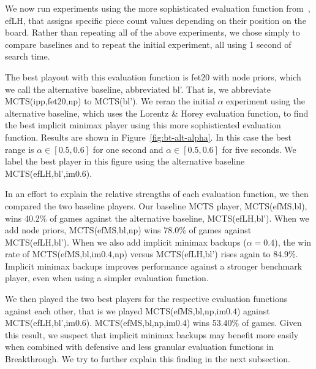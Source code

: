 \documentclass{article}
\begin{document}

\vspace{0.1cm}

We now run experiments using the more sophisticated evaluation function from~\cite{Lorentz13Breakthrough}, 
efLH, that assigns specific piece count values depending on their position on the board. 
Rather than repeating all of the above experiments, we chose simply to compare baselines and to repeat
the initial experiment, all using 1 second of search time.

The best playout with this evaluation function is fet$20$ with node priors, which we call the alternative baseline, 
abbreviated bl'.
That is, we abbreviate MCTS(ipp,fet$20$,np) to MCTS(bl').
We reran the initial $\alpha$ experiment using the alternative baseline, 
which uses the Lorentz \& Horey evaluation function, to find the best implicit minimax player using this 
more sophisticated evaluation function. Results are shown in Figure~\ref{fig:bt-alt-alpha}. 
In this case the best range is $\alpha \in [0.5,0.6]$ for one second and $\alpha \in [0.5,0.6]$ for
five seconds.
We label the best player in this figure using the alternative baseline MCTS(efLH,bl',im$0.6$). 

In an effort to explain the relative strengths of each evaluation function, we then compared the two baseline players. 
Our baseline MCTS player, MCTS(efMS,bl), wins 40.2\% of games against the alternative baseline, MCTS(efLH,bl'). 
When we add node priors, MCTS(efMS,bl,np) wins 78.0\% of games against MCTS(efLH,bl'). 
When we also add implicit minimax backups ($\alpha = 0.4$), the win rate of MCTS(efMS,bl,im$0.4$,np) versus MCTS(efLH,bl') rises again to 84.9\%. 
Implicit minimax backups improves performance against a stronger benchmark player, even when using a simpler evaluation function. 

We then played the two best players for the respective evaluation functions against each other, 
that is we played MCTS(efMS,bl,np,im$0.4$) against MCTS(efLH,bl',im$0.6$). 
MCTS(efMS,bl,np,im$0.4$) wins 53.40\% of games. 
Given this result, we suspect that implicit minimax backups may benefit more easily when 
combined with defensive and less granular evaluation functions in Breakthrough. We try to 
further explain this finding in the next subsection.\\
\end{document}
